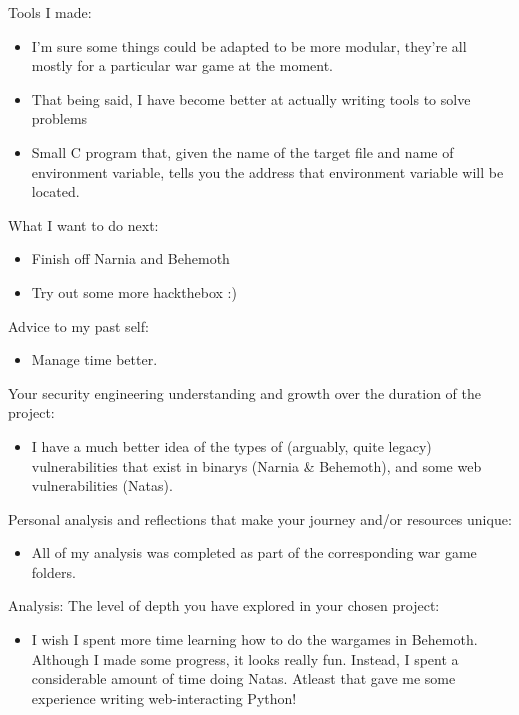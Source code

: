 \documentclass{article}
\begin{document}
Tools I made:

\begin{itemize}
	\item I'm sure some things could be adapted to be more modular, they're all mostly for a particular war game at the moment.
	\item That being said, I have become better at actually writing tools to solve problems
	\item Small C program that, given the name of the target file and name of environment variable, tells you the address that environment variable will be located.
\end{itemize}

What I want to do next:

\begin{itemize}
	\item Finish off Narnia and Behemoth
	\item Try out some more hackthebox :)
\end{itemize}

Advice to my past self:
	
\begin{itemize}
	\item Manage time better.
\end{itemize}

Your security engineering understanding and growth over the duration of the project:

\begin{itemize}
	\item I have a much better idea of the types of (arguably, quite legacy) vulnerabilities that exist in binarys (Narnia \& Behemoth), and some web vulnerabilities (Natas). 
\end{itemize}

Personal analysis and reflections that make your journey and/or resources unique:

\begin{itemize}
	\item All of my analysis was completed as part of the corresponding war game folders.
\end{itemize}

Analysis: The level of depth you have explored in your chosen project:

\begin{itemize}
	\item I wish I spent more time learning how to do the wargames in Behemoth. Although I made some progress, it looks really fun. Instead, I spent a considerable amount of time doing Natas. Atleast that gave me some experience writing web-interacting Python!
\end{itemize}
\end{document}
